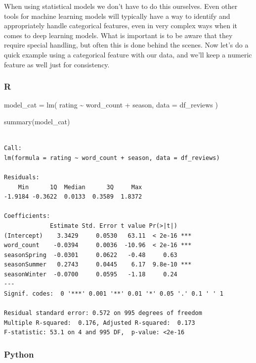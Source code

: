 \documentclass[
  letterpaper,
]{krantz}
\newenvironment{Shaded}{}{}
\newcommand{\AttributeTok}[1]{\textcolor[rgb]{0.49,0.56,0.16}{#1}}
\newcommand{\FunctionTok}[1]{\textcolor[rgb]{0.02,0.16,0.49}{#1}}
\newcommand{\NormalTok}[1]{#1}
\newcommand{\OtherTok}[1]{\textcolor[rgb]{0.00,0.44,0.13}{#1}}
\newcommand{\SpecialCharTok}[1]{\textcolor[rgb]{0.25,0.44,0.63}{#1}}
\begin{document}
When using statistical models we don't have to do this ourselves. Even
other tools for machine learning models will typically have a way to
identify and appropriately handle categorical features, even in very
complex ways when it comes to deep learning models. What is important is
to be aware that they require special handling, but often this is done
behind the scenes. Now let's do a quick example using a categorical
feature with our data, and we'll keep a numeric feature as well just for
consistency.

\subsubsection{R}

\begin{Shaded}
\begin{Highlighting}[]
\NormalTok{model\_cat }\OtherTok{=} \FunctionTok{lm}\NormalTok{(}
\NormalTok{    rating }\SpecialCharTok{\textasciitilde{}}\NormalTok{ word\_count }\SpecialCharTok{+}\NormalTok{ season,}
    \AttributeTok{data =}\NormalTok{ df\_reviews}
\NormalTok{)}

\FunctionTok{summary}\NormalTok{(model\_cat)}
\end{Highlighting}
\end{Shaded}

\begin{verbatim}

Call:
lm(formula = rating ~ word_count + season, data = df_reviews)

Residuals:
    Min      1Q  Median      3Q     Max 
-1.9184 -0.3622  0.0133  0.3589  1.8372 

Coefficients:
             Estimate Std. Error t value Pr(>|t|)    
(Intercept)    3.3429     0.0530   63.11  < 2e-16 ***
word_count    -0.0394     0.0036  -10.96  < 2e-16 ***
seasonSpring  -0.0301     0.0622   -0.48     0.63    
seasonSummer   0.2743     0.0445    6.17  9.8e-10 ***
seasonWinter  -0.0700     0.0595   -1.18     0.24    
---
Signif. codes:  0 '***' 0.001 '**' 0.01 '*' 0.05 '.' 0.1 ' ' 1

Residual standard error: 0.572 on 995 degrees of freedom
Multiple R-squared:  0.176, Adjusted R-squared:  0.173 
F-statistic: 53.1 on 4 and 995 DF,  p-value: <2e-16
\end{verbatim}

\subsubsection{Python}
\end{document}
